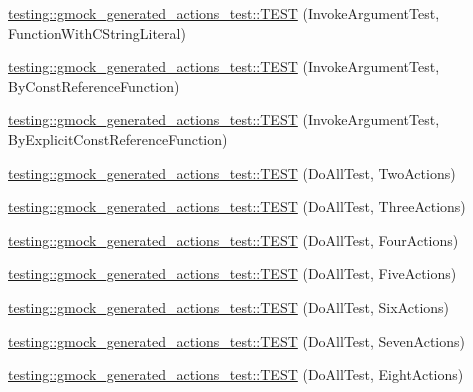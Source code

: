 \begin{DoxyCompactItemize}
\item 
\mbox{\hyperlink{namespacetesting_1_1gmock__generated__actions__test_a698f1a80b7fed18141fd170524908885}{testing\+::gmock\+\_\+generated\+\_\+actions\+\_\+test\+::\+T\+E\+ST}} (Invoke\+Argument\+Test, Function\+With\+C\+String\+Literal)
\item 
\mbox{\hyperlink{namespacetesting_1_1gmock__generated__actions__test_a82aff636cad2f441c584fc8e3c057d56}{testing\+::gmock\+\_\+generated\+\_\+actions\+\_\+test\+::\+T\+E\+ST}} (Invoke\+Argument\+Test, By\+Const\+Reference\+Function)
\item 
\mbox{\hyperlink{namespacetesting_1_1gmock__generated__actions__test_accb544431629bfb38a618343daaa54c2}{testing\+::gmock\+\_\+generated\+\_\+actions\+\_\+test\+::\+T\+E\+ST}} (Invoke\+Argument\+Test, By\+Explicit\+Const\+Reference\+Function)
\item 
\mbox{\hyperlink{namespacetesting_1_1gmock__generated__actions__test_ab1820fa999561582ae20885c4149a634}{testing\+::gmock\+\_\+generated\+\_\+actions\+\_\+test\+::\+T\+E\+ST}} (Do\+All\+Test, Two\+Actions)
\item 
\mbox{\hyperlink{namespacetesting_1_1gmock__generated__actions__test_a9fe00b82e3daa39501cefb4636b1909c}{testing\+::gmock\+\_\+generated\+\_\+actions\+\_\+test\+::\+T\+E\+ST}} (Do\+All\+Test, Three\+Actions)
\item 
\mbox{\hyperlink{namespacetesting_1_1gmock__generated__actions__test_aa6ed664752eab81abc0c8ec08bc28fe0}{testing\+::gmock\+\_\+generated\+\_\+actions\+\_\+test\+::\+T\+E\+ST}} (Do\+All\+Test, Four\+Actions)
\item 
\mbox{\hyperlink{namespacetesting_1_1gmock__generated__actions__test_adf15fb74ccf2a473a31f0ae733210f3f}{testing\+::gmock\+\_\+generated\+\_\+actions\+\_\+test\+::\+T\+E\+ST}} (Do\+All\+Test, Five\+Actions)
\item 
\mbox{\hyperlink{namespacetesting_1_1gmock__generated__actions__test_af9328f486c8862bfb3a08bd9c0b10a2d}{testing\+::gmock\+\_\+generated\+\_\+actions\+\_\+test\+::\+T\+E\+ST}} (Do\+All\+Test, Six\+Actions)
\item 
\mbox{\hyperlink{namespacetesting_1_1gmock__generated__actions__test_aa1eb8dae72fb173011bf64027f075cea}{testing\+::gmock\+\_\+generated\+\_\+actions\+\_\+test\+::\+T\+E\+ST}} (Do\+All\+Test, Seven\+Actions)
\item 
\mbox{\hyperlink{namespacetesting_1_1gmock__generated__actions__test_a7e7ffc936de010908f42193b951016e3}{testing\+::gmock\+\_\+generated\+\_\+actions\+\_\+test\+::\+T\+E\+ST}} (Do\+All\+Test, Eight\+Actions)

\end{DoxyCompactItemize}
